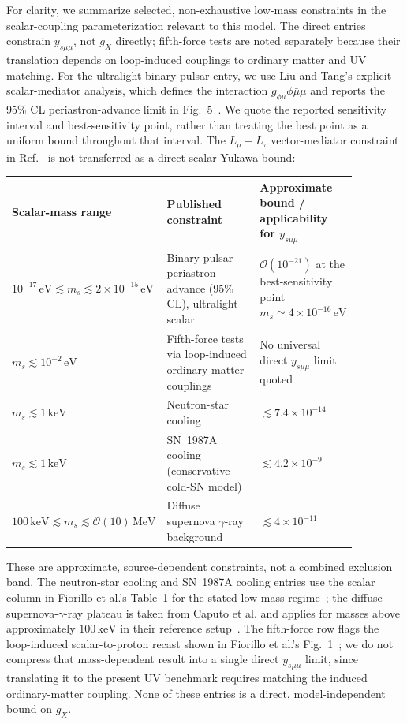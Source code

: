 \documentclass[12pt,a4paper]{article}
\begin{document}
For clarity, we summarize selected, non-exhaustive low-mass constraints in the scalar-coupling parameterization relevant to this model. The direct entries constrain \(y_{s\mu\mu}\), not \(g_X\) directly; fifth-force tests are noted separately because their translation depends on loop-induced couplings to ordinary matter and UV matching. For the ultralight binary-pulsar entry, we use Liu and Tang's explicit scalar-mediator analysis, which defines the interaction \(g_{\phi\mu}\phi\bar\mu\mu\) and reports the 95\% CL periastron-advance limit in Fig.~5~\cite{Liu:2025zuz}. We quote the reported sensitivity interval and best-sensitivity point, rather than treating the best point as a uniform bound throughout that interval. The \(L_\mu-L_\tau\) vector-mediator constraint in Ref.~\cite{Dror:2019uea} is not transferred as a direct scalar-Yukawa bound:
\begin{center}
\small
\begin{tabular}{P{0.28\linewidth}P{0.39\linewidth}P{0.20\linewidth}}
\hline
Scalar-mass range & Published constraint & Approximate bound / applicability for \(y_{s\mu\mu}\)\\
\hline
\(10^{-17}\,\mathrm{eV}\lesssim m_s\lesssim2\times10^{-15}\,\mathrm{eV}\) & Binary-pulsar periastron advance (95\% CL), ultralight scalar~\cite{Liu:2025zuz} & \(\mathcal{O}(10^{-21})\) at the best-sensitivity point \(m_s\simeq4\times10^{-16}\,\mathrm{eV}\)\\
\(m_s\lesssim10^{-2}\,\mathrm{eV}\) & Fifth-force tests via loop-induced ordinary-matter couplings~\cite{Fiorillo:2026wso,Hoskins:1985tn,Kapner:2006si,Blakemore:2021zna} & No universal direct \(y_{s\mu\mu}\) limit quoted\\
\(m_s\lesssim1\,\mathrm{keV}\) & Neutron-star cooling~\cite{Fiorillo:2026wso} & \(\lesssim7.4\times10^{-14}\)\\
\(m_s\lesssim1\,\mathrm{keV}\) & SN~1987A cooling (conservative cold-SN model)~\cite{Fiorillo:2026wso,Caputo:2021rux} & \(\lesssim4.2\times10^{-9}\)\\
\(100\,\mathrm{keV}\lesssim m_s\lesssim\mathcal{O}(10)\,\mathrm{MeV}\) & Diffuse supernova \(\gamma\)-ray background~\cite{Caputo:2021rux} & \(\lesssim4\times10^{-11}\)\\
\hline
\end{tabular}
\end{center}
These are approximate, source-dependent constraints, not a combined exclusion band. The neutron-star cooling and SN~1987A cooling entries use the scalar column in Fiorillo et al.'s Table~1 for the stated low-mass regime~\cite{Fiorillo:2026wso}; the diffuse-supernova-\(\gamma\)-ray plateau is taken from Caputo et al. and applies for masses above approximately \(100\,\mathrm{keV}\) in their reference setup~\cite{Caputo:2021rux}. The fifth-force row flags the loop-induced scalar-to-proton recast shown in Fiorillo et al.'s Fig.~1~\cite{Fiorillo:2026wso}; we do not compress that mass-dependent result into a single direct \(y_{s\mu\mu}\) limit, since translating it to the present UV benchmark requires matching the induced ordinary-matter coupling. None of these entries is a direct, model-independent bound on \(g_X\).
\end{document}
